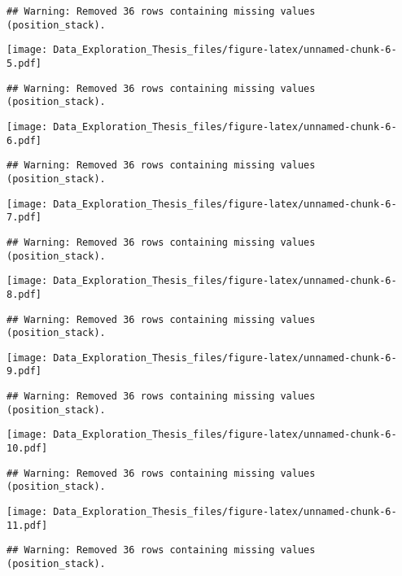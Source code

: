 \documentclass[]{article}
\begin{document}
\begin{verbatim}
## Warning: Removed 36 rows containing missing values (position_stack).
\end{verbatim}

\texttt{[image: Data\_Exploration\_Thesis\_files/figure-latex/unnamed-chunk-6-5.pdf]}

\begin{verbatim}
## Warning: Removed 36 rows containing missing values (position_stack).
\end{verbatim}

\texttt{[image: Data\_Exploration\_Thesis\_files/figure-latex/unnamed-chunk-6-6.pdf]}

\begin{verbatim}
## Warning: Removed 36 rows containing missing values (position_stack).
\end{verbatim}

\texttt{[image: Data\_Exploration\_Thesis\_files/figure-latex/unnamed-chunk-6-7.pdf]}

\begin{verbatim}
## Warning: Removed 36 rows containing missing values (position_stack).
\end{verbatim}

\texttt{[image: Data\_Exploration\_Thesis\_files/figure-latex/unnamed-chunk-6-8.pdf]}

\begin{verbatim}
## Warning: Removed 36 rows containing missing values (position_stack).
\end{verbatim}

\texttt{[image: Data\_Exploration\_Thesis\_files/figure-latex/unnamed-chunk-6-9.pdf]}

\begin{verbatim}
## Warning: Removed 36 rows containing missing values (position_stack).
\end{verbatim}

\texttt{[image: Data\_Exploration\_Thesis\_files/figure-latex/unnamed-chunk-6-10.pdf]}

\begin{verbatim}
## Warning: Removed 36 rows containing missing values (position_stack).
\end{verbatim}

\texttt{[image: Data\_Exploration\_Thesis\_files/figure-latex/unnamed-chunk-6-11.pdf]}

\begin{verbatim}
## Warning: Removed 36 rows containing missing values (position_stack).
\end{verbatim}
\end{document}
